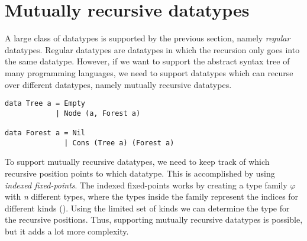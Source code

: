 \section{Mutually recursive datatypes}
A large class of datatypes is supported by the previous section, namely \textit{regular} datatypes. Regular datatypes are datatypes in which the recursion only goes into the same datatype. However, if we want to support the abstract syntax tree of many programming languages, we need to support datatypes which can recurse over different datatypes, namely mutually recursive datatypes.

\begin{verbatim}
data Tree a = Empty 
            | Node (a, Forest a)

data Forest a = Nil
              | Cons (Tree a) (Forest a)
\end{verbatim}

To support mutually recursive datatypes, we need to keep track of which recursive position points to which datatype. This is accomplished by using \textit{indexed fixed-points}\cite{yakushev2009generic}. The indexed fixed-points works by creating a type family $\varphi$ with \textit{n} different types, where the types inside the family represent the indices for different kinds (\inlinehaskell{*!$_{\varphi}$!}). Using the limited set of kinds we can determine the type for the recursive positions. Thus, supporting mutually recursive datatypes is possible, but it adds a lot more complexity.   